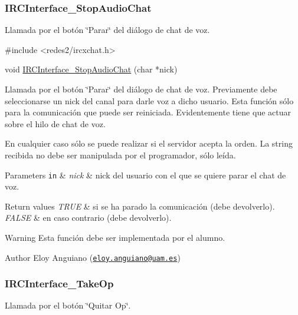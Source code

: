  \hypertarget{IRCInterface_StopAudioChat}{}\subsubsection{I\-R\-C\-Interface\-\_\-\-Stop\-Audio\-Chat}\label{IRCInterface_StopAudioChat}
Llamada por el botón \char`\"{}\-Parar\char`\"{} del diálogo de chat de voz.


\begin{DoxyCode}
\textcolor{preprocessor}{#include <redes2/ircxchat.h>}

\textcolor{keywordtype}{void} \hyperlink{xchat2_8c_a754a3d3dd311194637c07cc701e7d507}{IRCInterface\_StopAudioChat} (\textcolor{keywordtype}{char} *nick)
\end{DoxyCode}


Llamada por el botón \char`\"{}\-Parar\char`\"{} del diálogo de chat de voz. Previamente debe seleccionarse un nick del canal para darle voz a dicho usuario. Esta función sólo para la comunicación que puede ser reiniciada. Evidentemente tiene que actuar sobre el hilo de chat de voz.

En cualquier caso sólo se puede realizar si el servidor acepta la orden. La string recibida no debe ser manipulada por el programador, sólo leída.


\begin{DoxyParams}[1]{Parameters}
\mbox{\tt in}  & {\em nick} & nick del usuario con el que se quiere parar el chat de voz.\\
\hline
\end{DoxyParams}

\begin{DoxyRetVals}{Return values}
{\em T\-R\-U\-E} & si se ha parado la comunicación (debe devolverlo). \\
\hline
{\em F\-A\-L\-S\-E} & en caso contrario (debe devolverlo).\\
\hline
\end{DoxyRetVals}
\begin{DoxyWarning}{Warning}
Esta función debe ser implementada por el alumno.
\end{DoxyWarning}
\begin{DoxyAuthor}{Author}
Eloy Anguiano (\href{mailto:eloy.anguiano@uam.es}{\tt eloy.\-anguiano@uam.\-es})
\end{DoxyAuthor}


 \hypertarget{IRCInterface_TakeOp}{}\subsubsection{I\-R\-C\-Interface\-\_\-\-Take\-Op}\label{IRCInterface_TakeOp}
Llamada por el botón \char`\"{}\-Quitar Op\char`\"{}.


